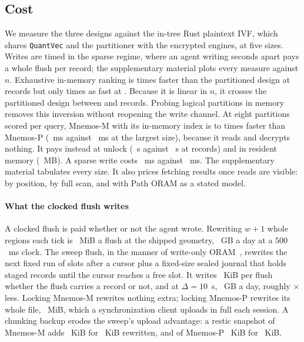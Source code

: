 \subsection{Cost}
\label{sec:eval-perf}

We measure the three designs against the in-tree Rust plaintext IVF, which shares
\texttt{QuantVec} and the partitioner with the encrypted engines, at five sizes. Writes are timed
in the sparse regime, where an agent writing seconds apart pays a whole flush per record; the
supplementary material plots every measure against $n$. Exhaustive in-memory ranking is
\REtenSpeedupSmall{} times faster than the partitioned design at \REtenNSmall{} records but only
\REtenSpeedupLarge{} times as fast at \REtenNLarge. Because it is linear in $n$, it crosses the
partitioned design between \REtenCrossLo{} and \REtenCrossHi{} records. Probing logical partitions
in memory removes this inversion without reopening the write channel. At eight partitions scored
per query, Mnemos-M with its in-memory index is \REtenIvfSpeedupMin{} to \REtenIvfSpeedupMax{}
times faster than Mnemos-P (\REtenIvfSearchLarge~ms against \REtenPSearchLarge~ms at the largest
size), because it reads and decrypts nothing. It pays instead at unlock (\REtenUnlockIvfLarge~s
against \REtenUnlockMLarge~s at \REtenNLarge{} records) and in resident memory
(\REtenResidentLarge~MB). A sparse write costs \REtenPutMLarge~ms against \REtenPutPLarge~ms. The
supplementary material tabulates every size. It also prices fetching results once reads are
visible: by position, by full scan, and with Path ORAM as a stated model.

\paragraph{What the clocked flush writes}
A clocked flush is paid whether or not the agent wrote. Rewriting $w+1$ whole regions each tick is
\REtwentyoneRegionMiB~MiB a flush at the shipped geometry, \REtwentyoneRegionGBDay~GB a day at a
$500$~ms clock. The sweep flush, in the manner of write-only
ORAM~\cite{roche2017detwooram,aviv2017oblivisync,blass2014hive}, rewrites the next fixed run of slots
after a cursor plus a fixed-size sealed journal that holds staged records until the cursor reaches a
free slot. It writes \REtwentyoneSweepKiB~KiB per flush whether the flush carries a record or not,
and at $\Delta = 10$~s, \REtwentyoneSweepGBDay~GB a day, roughly \REtwentyoneRatio${\times}$ less. Locking
Mnemos-M rewrites nothing extra; locking Mnemos-P rewrites its whole file,
\REtwentyonePLockMiB~MiB, which a synchronization client uploads in full each session. A
chunking backup erodes the sweep's upload advantage: a restic snapshot of Mnemos-M adds
\REnineteenAddedMOne~KiB for \REnineteenRewrittenMOne~KiB rewritten, and of Mnemos-P
\REnineteenAddedPOne~KiB for \REnineteenRewrittenPOne~KiB.

